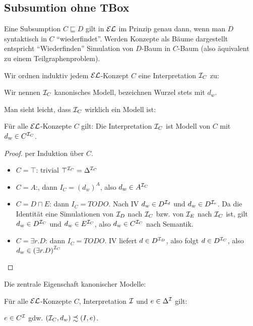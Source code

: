 \subsection{Subsumtion ohne TBox}\label{subsumtion-ohne-tbox}

Eine Subsumption $C \sqsubseteq D$ gilt in $\mathcal{E}\mathcal{L}$ im Prinzip genau dann, wenn
man $D$ syntaktisch in $C$ \enquote{wiederfindet}. Werden Konzepte als
Bäume dargestellt entspricht \enquote{Wiederfinden} Simulation von
$D$-Baum in $C$-Baum (also äquivalent zu einem Teilgraphenproblem).

\begin{definition}
    Wir ordnen induktiv jedem $\mathcal{E}\mathcal{L}$-Konzept $C$ eine Interpretation $\mathcal{I}_C$ zu:

    Wir nennen $\mathcal{I}_C$ kanonisches Modell, bezeichnen Wurzel stets mit $d_w$.
\end{definition}

Man sieht leicht, dass $\mathcal{I}_C$ wirklich ein Modell ist:

\begin{lemma}\label{lem:68}
    Für alle $\mathcal{E}\mathcal{L}$-Konzepte $C$ gilt: Die Interpretation $\mathcal{I}_C$ ist Modell von $C$ mit $d_w \in C^{\mathcal{I}_C}$.
\end{lemma}

\begin{tafel}
    \begin{proof} per Induktion über $C$.
        \begin{itemize}
            \item $C = \top$: trivial $\top^{\mathcal{I}_C} = \Delta^{\mathcal{I}_C}$
            \item $C = A$:, dann $I_C = {(d_w)}^A$, also $d_w \in A^{\mathcal{I}_C}$
            \item $C = D \sqcap E$: dann $I_C = TODO$. Nach IV $d_w \in D^{\mathcal{I}_d}$ und $d_w \in D^{\mathcal{I}_e}$. Da die Identität eine Simulationen von $\mathcal{I}_D$ nach $\mathcal{I}_C$ bzw. von $\mathcal{I}_E$ nach $\mathcal{I}_C$ ist, gilt $d_w \in D^{\mathcal{I}_C}$ und $d_w \in E^{\mathcal{I}_C}$, also $d_w \in C^{\mathcal{I}_C}$ nach Semantik.
            \item $C = \exists r.D$: dann $I_C = TODO$. IV liefert $d \in D^{\mathcal{I}_D}$, also folgt $d \in D^{\mathcal{I}_C}$, also $d_w \in {(\exists r.D)}^{\mathcal{I}_C}$
        \end{itemize}
    \end{proof}
\end{tafel}

Die zentrale Eigenschaft kanonischer Modelle:
\begin{lemma}\label{lem:69}
Für alle $\mathcal{E}\mathcal{L}$-Konzepte $C$, Interpretation $\mathcal{I}$ und
$e \in \Delta^{\mathcal{I}}$ gilt:
\begin{center}
$e \in C^{\mathcal{I}}$ gdw.
$\left( \MI_C,d_w \right) \precsim \left( I,e \right)$.
\end{center}
\end{lemma}

